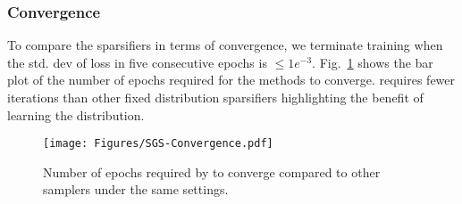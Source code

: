 \subsubsection{Convergence}
\label{subsubsec:convergence}
To compare the sparsifiers in terms of convergence, we terminate training when the std. dev of loss in five consecutive epochs is $\leq 1e^{-3}$. Fig.~\ref{fig:convergence} shows the bar plot of the number of epochs required for the methods to converge. \sgs requires fewer iterations than other fixed distribution sparsifiers highlighting the benefit of learning the distribution.

\begin{figure}[!htbp]
    \centering    \texttt{[image: Figures/SGS-Convergence.pdf]}
    \caption{Number of epochs required by \sgs to converge compared to other samplers under the same settings.}
    \label{fig:convergence}
\end{figure}


